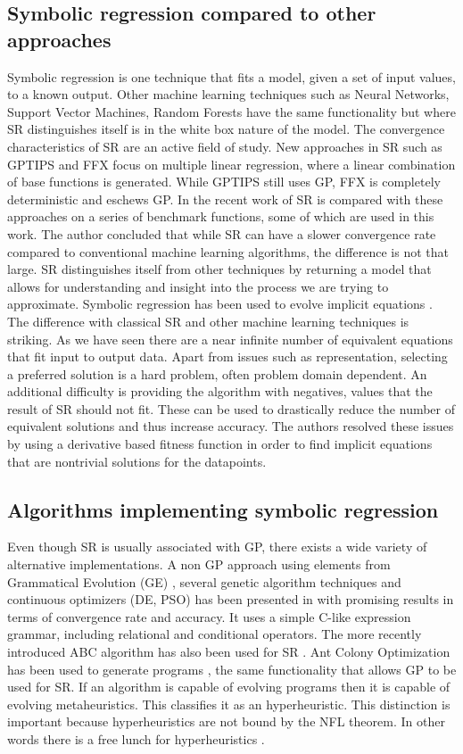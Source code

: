 \subsection{Symbolic regression compared to other approaches}
Symbolic regression is one technique that fits a model, given a set of input values, to a known output. Other machine learning techniques such as Neural Networks, Support Vector Machines, Random Forests have the same functionality but where SR distinguishes itself is in the white box nature of the model. The convergence characteristics of SR are an active field of study. New approaches in SR such as GPTIPS and FFX \citep{GPTIPS, FFX} focus on multiple linear regression, where a linear combination of base functions is generated. While GPTIPS still uses GP, FFX is completely deterministic and eschews GP.
In the recent work of \citep{SRlinear} SR is compared with these approaches on a series of benchmark functions, some of which are used in this work. The author concluded that while SR can have a slower convergence rate compared to conventional machine learning algorithms, the difference is not that large. SR distinguishes itself from other techniques by returning a model that allows for understanding and insight into the process we are trying to approximate.
Symbolic regression has been used to evolve implicit equations \citep{SRimplicit}. The difference with classical SR and other machine learning techniques is striking. As we have seen there are a near infinite number of equivalent equations that fit input to output data. Apart from issues such as representation, selecting a preferred solution is a hard problem, often problem domain dependent. An additional difficulty is providing the algorithm with negatives, values that the result of SR should not fit. These can be used to drastically reduce the number of equivalent solutions and thus increase accuracy. The authors resolved these issues by using a derivative based fitness function in order to find implicit equations that are nontrivial solutions for the datapoints.

\subsection{Algorithms implementing symbolic regression}
Even though SR is usually associated with GP, there exists a wide variety of alternative implementations.
A non GP approach using elements from Grammatical Evolution (GE) \cite{GE}, several genetic algorithm techniques and continuous optimizers (DE, PSO) has been presented in \citep{AEG} with promising results in terms of convergence rate and accuracy. 
It uses a simple C-like expression grammar, including relational and conditional operators. 
The more recently introduced ABC algorithm has also been used for SR \cite{ABCSR}. 
Ant Colony Optimization \citep{ACO} has been used to generate programs \citep{ACOSR}, the same functionality that allows GP to be used for SR.
If an algorithm is capable of evolving programs then it is capable of evolving metaheuristics. This classifies it as an hyperheuristic. This distinction is important because hyperheuristics are not bound by the NFL theorem. In other words there is a free lunch for hyperheuristics \cite{HyperNFL}. 

